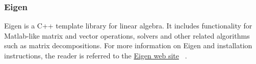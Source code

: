 \subsubsection{Eigen} \label{sec:eigen}
Eigen is a C++ template library for linear algebra. It includes functionality for Matlab-like matrix and vector operations, solvers and other related algorithms such as matrix decompositions. For more information on Eigen and installation instructions, the reader is referred to the {\color{blue} \href{http://eigen.tuxfamily.org/index.php?title=Main_Page}{Eigen web site}} ~\cite{eigenweb}.